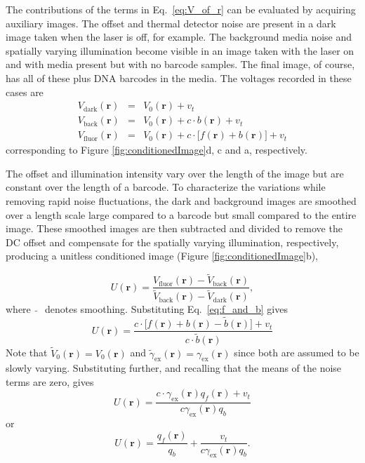 The contributions of the terms in Eq.~\ref{eq:V_of_r} can be evaluated by acquiring auxiliary images. The offset and thermal detector noise are present in a dark image taken when the laser is off, for example. The background media noise and spatially varying illumination become visible in an image taken with the laser on and with media present but with no barcode samples. The final image, of course, has all of these plus DNA barcodes in the media. The voltages recorded in these cases are
\begin{eqnarray}
V_{\text{dark}}(\mathbf{r})&=&V_0(\mathbf{r})+v_t\\
V_{\text{back}}(\mathbf{r})&=&V_0(\mathbf{r})+c \cdot  b(\mathbf{r})  +v_t\\
V_{\text{fluor}}(\mathbf{r})&=&V_0(\mathbf{r})+c \cdot \big[ f(\mathbf{r}) + b(\mathbf{r})\big]  +v_t
\end{eqnarray}
corresponding to Figure \ref{fig:conditionedImage}d, c and a, respectively. 

The offset and illumination intensity vary over the length of the image but are constant over the length of a barcode. To characterize the variations while removing rapid noise fluctuations, the dark and background images are smoothed over a length scale large compared to a barcode but small compared to the entire image. These smoothed images are then subtracted and divided to remove the DC offset and compensate for the spatially varying illumination, respectively, producing a unitless conditioned image (Figure \ref{fig:conditionedImage}b),

\begin{equation}
U(\mathbf{r})= \frac{ V_{\text{fluor}}(\mathbf{r}) - \widetilde{V}_{\text{back}}(\mathbf{r})  }{ \widetilde{V}_{\text{back}}(\mathbf{r}) - \widetilde{V}_{\text{dark}}(\mathbf{r})} ,
\end{equation}
where~$\widetilde{~~}$~denotes smoothing. Substituting Eq.~\ref{eq:f_and_b} gives
\begin{equation}
U(\mathbf{r})= \frac{ c \cdot \big[ f(\mathbf{r})  +b(\mathbf{r}) -\widetilde{b}(\mathbf{r}) \big]+ v_t  }{   c \cdot \widetilde{b}(\mathbf{r}) }
\end{equation}
Note that $\widetilde{V}_0(\mathbf{r}) = V_0(\mathbf{r})$ and $\widetilde{\gamma}_{\text{ex}}(\mathbf{r})  = \gamma_{\text{ex}}(\mathbf{r})$ since both are assumed to be slowly varying. Substituting further, and recalling that the means of the noise terms are zero, gives
\begin{equation}
U(\mathbf{r})= \frac{ c \cdot \gamma_{\text{ex}}(\mathbf{r}) q_f(\mathbf{r})  + v_t  }{ c \gamma_{\text{ex}}(\mathbf{r})  q_b }
\end{equation}
or
\begin{equation}\label{eq:realDeal}
U(\mathbf{r})= \frac{ q_f(\mathbf{r}) }{ q_b}   + \frac{ v_t }{   c \gamma_{\text{ex}}(\mathbf{r}) q_b}.
\end{equation}


